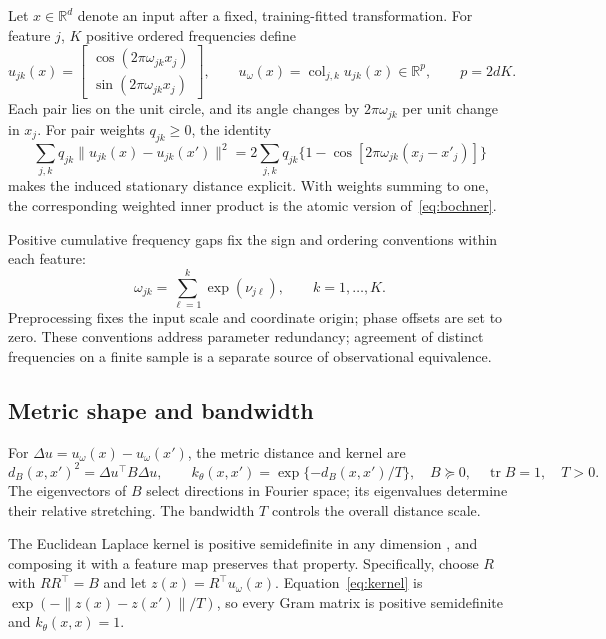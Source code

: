 \documentclass[11pt]{article}
\newcommand{\R}{\mathbb R}
\newcommand{\tr}{\operatorname{tr}}
\begin{document}
Let $x\in\R^d$ denote an input after a fixed, training-fitted transformation. For feature $j$, $K$ positive ordered frequencies define
\begin{equation}
 u_{jk}(x)=\begin{bmatrix}\cos(2\pi\omega_{jk}x_j)\\ \sin(2\pi\omega_{jk}x_j)\end{bmatrix},
 \qquad u_\omega(x)=\operatorname{col}_{j,k}u_{jk}(x)\in\R^p,
 \qquad p=2dK.
 \label{eq:features}
\end{equation}
Each pair lies on the unit circle, and its angle changes by $2\pi\omega_{jk}$ per unit change in $x_j$. For pair weights $q_{jk}\geq0$, the identity
\begin{equation}
 \sum_{j,k}q_{jk}\|u_{jk}(x)-u_{jk}(x')\|^2
 =2\sum_{j,k}q_{jk}\{1-\cos[2\pi\omega_{jk}(x_j-x'_j)]\}
 \label{eq:chord}
\end{equation}
makes the induced stationary distance explicit. With weights summing to one, the corresponding weighted inner product is the atomic version of~\eqref{eq:bochner}.

Positive cumulative frequency gaps fix the sign and ordering conventions within each feature:
\begin{equation}
 \omega_{jk}=\sum_{\ell=1}^{k}\exp(\nu_{j\ell}),\qquad k=1,\ldots,K.
 \label{eq:gaps}
\end{equation}
Preprocessing fixes the input scale and coordinate origin; phase offsets are set to zero. These conventions address parameter redundancy; agreement of distinct frequencies on a finite sample is a separate source of observational equivalence.

\subsection{Metric shape and bandwidth}
For $\Delta u=u_\omega(x)-u_\omega(x')$, the metric distance and kernel are
\begin{equation}
 d_B(x,x')^2=\Delta u^\top B\Delta u,
 \qquad k_\theta(x,x')=\exp\{-d_B(x,x')/T\},
 \quad B\succeq0,\quad\tr B=1,\quad T>0.
 \label{eq:kernel}
\end{equation}
The eigenvectors of $B$ select directions in Fourier space; its eigenvalues determine their relative stretching. The bandwidth $T$ controls the overall distance scale.

The Euclidean Laplace kernel is positive semidefinite in any dimension \cite[Theorem~1 and Corollary~1]{schoenberg1938}, and composing it with a feature map preserves that property. Specifically, choose $R$ with $RR^\top=B$ and let $z(x)=R^\top u_\omega(x)$. Equation~\eqref{eq:kernel} is $\exp(-\|z(x)-z(x')\|/T)$, so every Gram matrix is positive semidefinite and $k_\theta(x,x)=1$.
\end{document}

